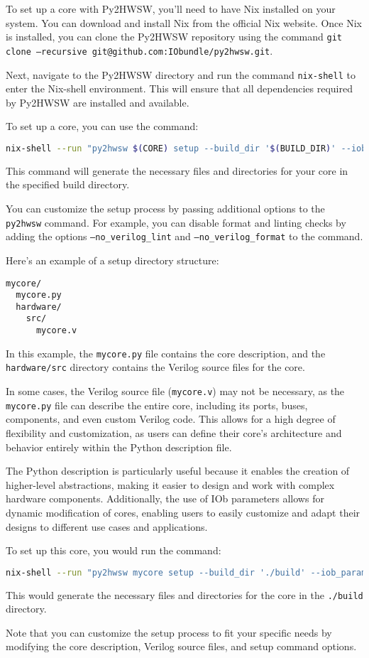 %

To set up a core with Py2HWSW, you'll need to have Nix installed on your system. You can download and install Nix from the official Nix website. Once Nix is installed, you can clone the Py2HWSW repository using the command \texttt{git clone --recursive git@github.com:IObundle/py2hwsw.git}.

Next, navigate to the Py2HWSW directory and run the command \texttt{nix-shell} to enter the Nix-shell environment. This will ensure that all dependencies required by Py2HWSW are installed and available.

To set up a core, you can use the command:
\begin{lstlisting}[language=bash]
nix-shell --run "py2hwsw $(CORE) setup --build_dir '$(BUILD_DIR)' --iob_params 'param1=param1_val:param2=param2_val'"
\end{lstlisting}

This command will generate the necessary files and directories for your core in the specified build directory.

You can customize the setup process by passing additional options to the \texttt{py2hwsw} command. For example, you can disable format and linting checks by adding the options \texttt{--no\_verilog\_lint} and \texttt{--no\_verilog\_format} to the command.

Here's an example of a setup directory structure:
\begin{verbatim}
mycore/
  mycore.py
  hardware/
    src/
      mycore.v
\end{verbatim}
In this example, the \texttt{mycore.py} file contains the core description, and the \texttt{hardware/src} directory contains the Verilog source files for the core.

In some cases, the Verilog source file (\texttt{mycore.v}) may not be necessary, as the \texttt{mycore.py} file can describe the entire core, including its ports, buses, components, and even custom Verilog code. This allows for a high degree of flexibility and customization, as users can define their core's architecture and behavior entirely within the Python description file.

The Python description is particularly useful because it enables the creation of higher-level abstractions, making it easier to design and work with complex hardware components. Additionally, the use of IOb parameters allows for dynamic modification of cores, enabling users to easily customize and adapt their designs to different use cases and applications.

To set up this core, you would run the command:
\begin{lstlisting}[language=bash]
nix-shell --run "py2hwsw mycore setup --build_dir './build' --iob_params 'param1=param1_val:param2=param2_val'"
\end{lstlisting}

This would generate the necessary files and directories for the core in the \texttt{./build} directory.

Note that you can customize the setup process to fit your specific needs by modifying the core description, Verilog source files, and setup command options.

